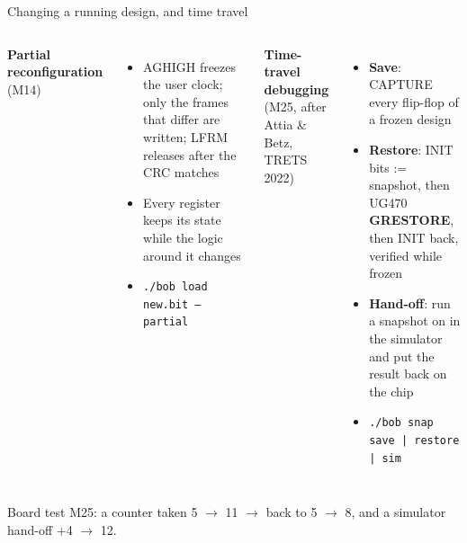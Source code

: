 \documentclass[aspectratio=169,11pt]{beamer}
\newcommand{\src}[1]{{\scriptsize\color{bobmute}#1}}
\begin{document}
\begin{frame}{Changing a running design, and time travel}
  \begin{columns}[T]
    \textbf{Partial reconfiguration} (M14)
    \small
    \begin{itemize}
      \item AGHIGH freezes the user clock; only the \alert{frames that differ} are written; LFRM releases after the CRC matches
      \item Every register keeps its state while the logic around it changes
      \item \texttt{./bob load new.bit --partial}
    \end{itemize}
    \textbf{Time-travel debugging} (M25, after Attia \& Betz, TRETS 2022)
    \small
    \begin{itemize}
      \item \textbf{Save}: CAPTURE every flip-flop of a frozen design
      \item \textbf{Restore}: INIT bits := snapshot, then UG470 \textbf{GRESTORE}, then INIT back, verified while frozen
      \item \textbf{Hand-off}: run a snapshot on in the simulator and put the result back on the chip
      \item \texttt{./bob snap save | restore | sim}
    \end{itemize}
  \end{columns}
  \vspace{3mm}
  \centering
  \src{Board test M25: a counter taken 5 $\rightarrow$ 11 $\rightarrow$ back to 5 $\rightarrow$ 8, and a simulator hand-off +4 $\rightarrow$ 12.}
\end{frame}

\end{document}
